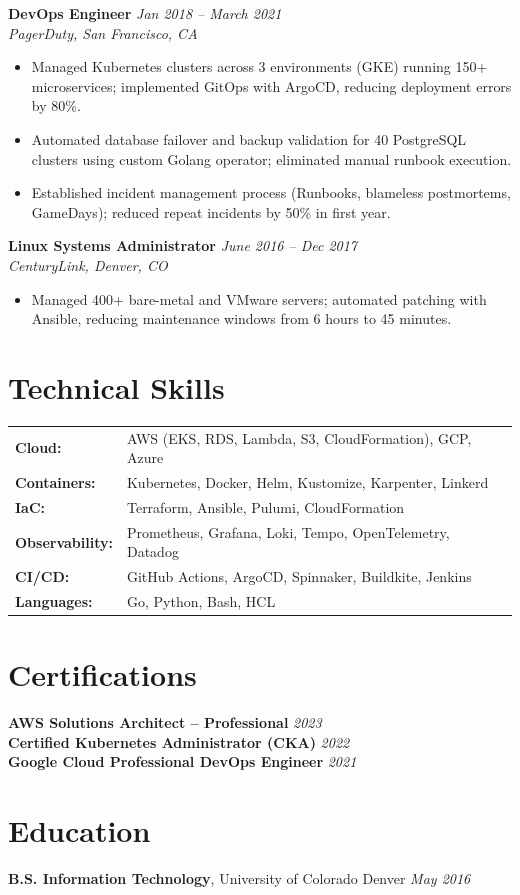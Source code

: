 \documentclass[11pt,a4paper]{article}
\begin{document}
\vspace{4pt}
\noindent\textbf{DevOps Engineer} \hfill \textit{Jan 2018 -- March 2021}\\
\textit{PagerDuty, San Francisco, CA}
\begin{itemize}
  \item Managed Kubernetes clusters across 3 environments (GKE) running 150+ microservices; implemented GitOps with ArgoCD, reducing deployment errors by 80\%.
  \item Automated database failover and backup validation for 40 PostgreSQL clusters using custom Golang operator; eliminated manual runbook execution.
  \item Established incident management process (Runbooks, blameless postmortems, GameDays); reduced repeat incidents by 50\% in first year.
\end{itemize}

\vspace{4pt}
\noindent\textbf{Linux Systems Administrator} \hfill \textit{June 2016 -- Dec 2017}\\
\textit{CenturyLink, Denver, CO}
\begin{itemize}
  \item Managed 400+ bare-metal and VMware servers; automated patching with Ansible, reducing maintenance windows from 6 hours to 45 minutes.
\end{itemize}

\section{Technical Skills}
\begin{tabular}{@{}ll}
\textbf{Cloud:}            & AWS (EKS, RDS, Lambda, S3, CloudFormation), GCP, Azure \\
\textbf{Containers:}       & Kubernetes, Docker, Helm, Kustomize, Karpenter, Linkerd \\
\textbf{IaC:}              & Terraform, Ansible, Pulumi, CloudFormation \\
\textbf{Observability:}    & Prometheus, Grafana, Loki, Tempo, OpenTelemetry, Datadog \\
\textbf{CI/CD:}            & GitHub Actions, ArgoCD, Spinnaker, Buildkite, Jenkins \\
\textbf{Languages:}        & Go, Python, Bash, HCL \\
\end{tabular}

\section{Certifications}
\textbf{AWS Solutions Architect -- Professional} \hfill \textit{2023}\\
\textbf{Certified Kubernetes Administrator (CKA)} \hfill \textit{2022}\\
\textbf{Google Cloud Professional DevOps Engineer} \hfill \textit{2021}

\section{Education}
\textbf{B.S. Information Technology}, University of Colorado Denver \hfill \textit{May 2016}
\end{document}
